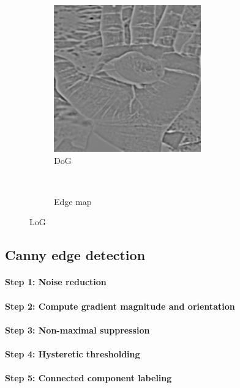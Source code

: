 \documentclass[12pt]{article}
\begin{document}
\begin{figure}[H]
    \centering
    \begin{subfigure}[t]{0.5\textwidth}
        \centering
        \includegraphics[height=2.5in]{images/dog_grad}
        \caption{DoG}
    \end{subfigure}%
    ~
    \begin{subfigure}[t]{0.5\textwidth}
        \centering
        \caption{Edge map}
    \end{subfigure}
    \caption{LoG}
    \label{fig:dog}
\end{figure}

\subsection*{Canny edge detection}
\paragraph*{Step 1: Noise reduction}

\paragraph*{Step 2: Compute gradient magnitude and orientation}

\paragraph*{Step 3: Non-maximal suppression}

\paragraph*{Step 4: Hysteretic thresholding}

\paragraph*{Step 5: Connected component labeling}
\end{document}
